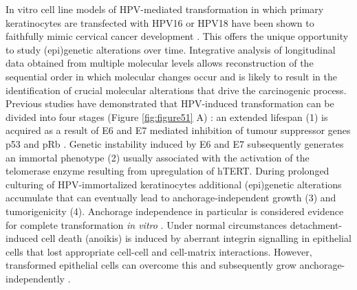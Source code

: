 In vitro cell line models of HPV-mediated transformation in which primary keratinocytes are transfected with HPV16 or HPV18 have been shown to faithfully mimic cervical cancer development \cite{Steenbergen1996, Steenbergen2004, Wilting2006, Henken2007, Smeets2011}. This offers the unique opportunity to study (epi)genetic alterations over time. Integrative analysis of longitudinal data obtained from multiple molecular levels allows reconstruction of the sequential order in which molecular changes occur and is likely to result in the identification of crucial molecular alterations that drive the carcinogenic process. Previous studies have demonstrated that HPV-induced transformation can be divided into four stages (Figure \ref{fig:figure51} A) \cite{Chen1993, Steenbergen2005, Schutze2014}: an extended lifespan (1) is acquired as a result of E6 and E7 mediated inhibition of tumour suppressor genes p53 and pRb \cite{Moody2010, Klingelhutz2012}. Genetic instability induced by E6 and E7 subsequently generates an immortal phenotype (2) usually associated with the activation of the telomerase enzyme resulting from upregulation of hTERT. During prolonged culturing of HPV-immortalized keratinocytes additional (epi)genetic alterations accumulate that can eventually lead to anchorage-independent growth (3) and tumorigenicity (4). Anchorage independence in particular is considered evidence for complete transformation \textit{in vitro} \cite{Freedman1974, Mori2009}. Under normal circumstances detachment-induced cell death (anoikis) is induced by aberrant integrin signalling in epithelial cells that lost appropriate cell-cell and cell-matrix interactions. However, transformed epithelial cells can overcome this and subsequently grow anchorage- independently \cite{Guadamillas2011}. 

